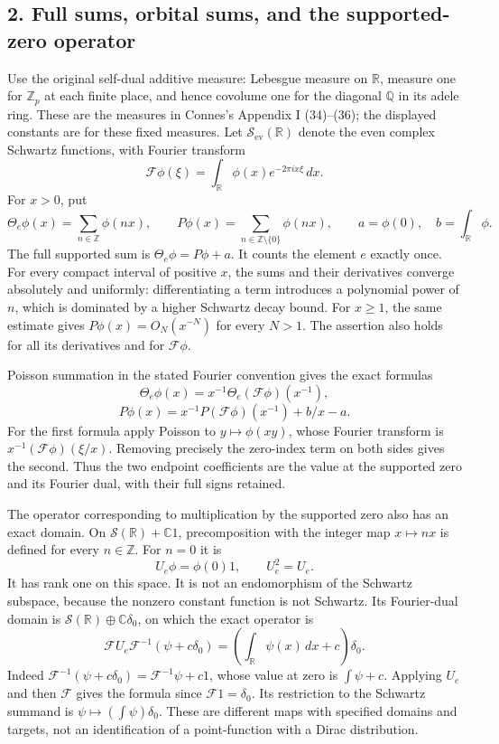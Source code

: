 \documentclass[
  10pt,
  a4paper,
]{article}
\begin{document}
\subsection{2. Full sums, orbital sums, and the supported-zero
operator}\label{full-sums-orbital-sums-and-the-supported-zero-operator}

Use the original self-dual additive measure: Lebesgue measure on
\(\mathbb R\), measure one for \(\mathbb Z_p\) at each finite place, and
hence covolume one for the diagonal \(\mathbb Q\) in its adele ring.
These are the measures in Connes's Appendix I (34)--(36); the displayed
constants are for these fixed measures. Let
\(\mathcal S_{\mathrm{ev}}(\mathbb R)\) denote the even complex Schwartz
functions, with Fourier transform \[
\mathcal F\phi(\xi)=\int_{\mathbb R}\phi(x)e^{-2\pi i x\xi}\,dx.
\tag{SZW5}
\] For \(x>0\), put \[
\Theta_e\phi(x)=\sum_{n\in\mathbb Z}\phi(nx),\qquad
P\phi(x)=\sum_{n\in\mathbb Z\setminus\{0\}}\phi(nx),\qquad
a=\phi(0),\quad b=\int_{\mathbb R}\phi.
\tag{SZW6}
\] The full supported sum is \(\Theta_e\phi=P\phi+a\). It counts the
element \(e\) exactly once. For every compact interval of positive
\(x\), the sums and their derivatives converge absolutely and uniformly:
differentiating a term introduces a polynomial power of \(n\), which is
dominated by a higher Schwartz decay bound. For \(x\ge1\), the same
estimate gives \(P\phi(x)=O_N(x^{-N})\) for every \(N>1\). The assertion
also holds for all its derivatives and for \(\mathcal F\phi\).

Poisson summation in the stated Fourier convention gives the exact
formulas \[
\Theta_e\phi(x)=x^{-1}\Theta_e(\mathcal F\phi)(x^{-1}),
\] \[
P\phi(x)=x^{-1}P(\mathcal F\phi)(x^{-1})+b/x-a.
\tag{SZW7}
\] For the first formula apply Poisson to \(y\mapsto\phi(xy)\), whose
Fourier transform is \(x^{-1}(\mathcal F\phi)(\xi/x)\). Removing
precisely the zero-index term on both sides gives the second. Thus the
two endpoint coefficients are the value at the supported zero and its
Fourier dual, with their full signs retained.

The operator corresponding to multiplication by the supported zero also
has an exact domain. On \(\mathcal S(\mathbb R)+\mathbb C1\),
precomposition with the integer map \(x\mapsto nx\) is defined for every
\(n\in\mathbb Z\). For \(n=0\) it is \[
U_e\phi=\phi(0)1,\qquad U_e^2=U_e.
\tag{SZW8}
\] It has rank one on this space. It is not an endomorphism of the
Schwartz subspace, because the nonzero constant function is not
Schwartz. Its Fourier-dual domain is
\(\mathcal S(\mathbb R)\oplus\mathbb C\delta_0\), on which the exact
operator is \[
\mathcal F U_e\mathcal F^{-1}(\psi+c\delta_0)
=\left(\int_{\mathbb R}\psi(x)\,dx+c\right)\delta_0.
\tag{SZW8a}
\] Indeed \(\mathcal F^{-1}(\psi+c\delta_0)=\mathcal F^{-1}\psi+c1\),
whose value at zero is \(\int\psi+c\). Applying \(U_e\) and then
\(\mathcal F\) gives the formula since \(\mathcal F1=\delta_0\). Its
restriction to the Schwartz summand is
\(\psi\mapsto(\int\psi)\delta_0\). These are different maps with
specified domains and targets, not an identification of a point-function
with a Dirac distribution.
\end{document}
